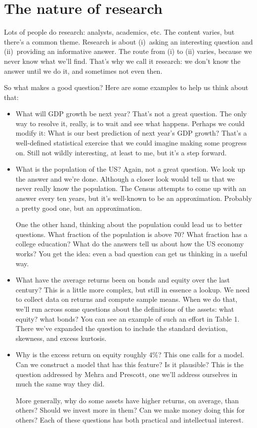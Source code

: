 \documentclass[11pt]{article}
\begin{document}
\section{The nature of research}

Lots of people do research:  analysts, academics, etc.
The content varies, but there's a common theme.
Research is about
(i)~asking an interesting question
and (ii)~providing an informative answer.
The route from (i) to (ii) varies, because we never know
what we'll find.
That's why we call it research:
we don't know the answer until we do it,
and sometimes not even then.

So what makes a good question?
Here are some examples to help us think about that:
%
\begin{itemize}
\item What will GDP growth be next year?
That's not a great question.  The only way to resolve it, really,
is to wait and see what happens.
Perhaps we could modify it:
What is our best prediction of next year's GDP growth?
That's a well-defined statistical exercise that we could
imagine making some progress on.
Still not wildly interesting, at least to me,
but it's a step forward.

\item What is the population of the US?
Again, not a great question.
We look up the answer and we're done.
Although a closer look would tell us that we never really know
the population.
The Census attempts to come up with an answer every ten years,
but it's well-known to be an approximation.
Probably a pretty good one, but an approximation.

One the other hand, thinking about the population could lead us
to better questions.
What fraction of the population is above 70?
What fraction has a college education?
What do the answers tell us about how the US economy works?
You get the idea:  even a bad question can get us thinking in a useful way.

\item What have the average returns been on bonds and equity over the last
century?
This is a little more complex, but still in essence a lookup.
We need to collect data on returns and compute sample means.
When we do that, we'll run across some questions about the definitions
of the assets:  what equity?  what bonds?
You can see an example of such an effort in Table 1.
There we've expanded the question to include the standard deviation,
skewness, and excess kurtosis.

\item Why is the excess return on equity roughly 4\%?
This one calls for a model.
Can we construct a model that has this feature?
Is it plausible?
This is the question addressed by Mehra and Prescott,
one we'll address ourselves in much the same way they did.

More generally, why do some assets have higher returns, on average, than others?
Should we invest more in them?  Can we make money doing this for others?
Each of these questions has both practical and intellectual interest.
\end{itemize}
\end{document}
